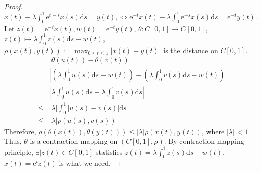 \documentclass{ctexart}
\renewcommand{\(}{\left(}
\renewcommand{\)}{\right)}
\newcommand{\e}{\mathrm{e}}
\newcommand{\eleto}{\mapsto}
\begin{document}
\begin{proof}
  $x(t)-\lambda \int_0^1 \e^{t-s} x(s) \mathrm{d} s=y(t),\Leftrightarrow \e^{-t} x(t)-\lambda \int_0^1 \e^{-s} x(s) \mathrm{d} s=\e^{-t}y(t).$\\
  Let $z(t)=\e^{-t}x(t),w(t)=\e^{-t}y(t)$,  $\theta: C[0,1]\to C[0,1]$, $z(t)\eleto \lambda \int_0^1 z(s) \mathrm{d} s-w(t)$,  $\rho(x(t),y(t)):=\max_{0\leq t\leq 1}|x(t)-y(t)|$ is the distance on $C[0,1]$.
  \begin{equation}
    \begin{aligned}
           & |\theta(u(t))-\theta(v(t))|                                                           \\
      =    & |(\lambda \int_0^1 u(s) \mathrm{d} s-w(t))-(\lambda \int_0^1 v(s) \mathrm{d} s-w(t))| \\
      =    & |\lambda \int_0^1 u(s) \mathrm{d} s-\lambda \int_0^1 v(s) \mathrm{d} s|               \\
      \leq & |\lambda |\int_0^1|u(s)-v(s)|\mathrm{d}  s                                            \\
      \leq & |\lambda|\rho(u(s),v(s))
    \end{aligned}\end{equation}
  Therefore, $\rho(\theta(x(t)),\theta(y(t)))\leq |\lambda|\rho(x(t),y(t))$, where $|\lambda|<1$.
  Thus, $\theta$ is a contraction mapping on $(C[0,1],\rho)$. By contraction mapping principle, $\exists |z(t)\in C[0,1]$ statisfies $z(t)=\lambda \int_0^1 z(s) \mathrm{d} s-w(t)$. $x(t)=\e^{t}z(t)$ is what we need.
\end{proof}
\end{document}
